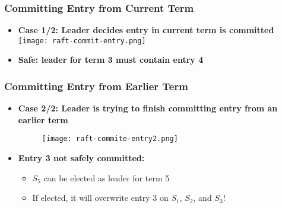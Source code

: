 \begin{frame}
    \frametitle{Committing Entry from Current Term}
    \begin{itemize}
        \item \textbf{Case 1/2: Leader decides entry in current term is committed}
        \texttt{[image: raft-commit-entry.png]}
        \item \textbf{Safe: leader for term 3 must contain entry 4}
    \end{itemize}
\end{frame}

\begin{frame}
    \frametitle{Committing Entry from Earlier Term}
    \begin{itemize}
        \item \textbf{Case 2/2: Leader is trying to finish committing entry from an earlier term}

        \begin{figure}
            \centering
            \texttt{[image: raft-commite-entry2.png]}
        \end{figure}

        \item \textbf{Entry 3 not safely committed:}
            \begin{itemize}
                \item $S_5$ can be elected as leader for term 5
                \item If elected, it will overwrite entry 3 on $S_1$, $S_2$, and $S_3$!
            \end{itemize}
    \end{itemize}
\end{frame}

